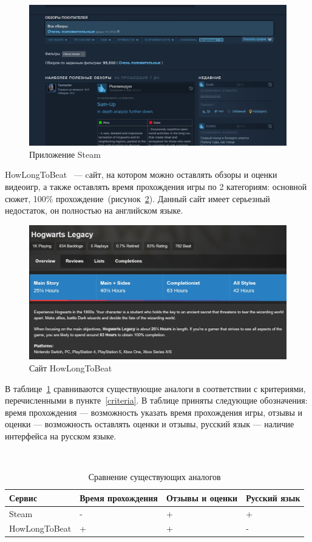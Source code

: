 \begin{figure}[H]
	\centering
	\includegraphics[width=0.7\linewidth]{../imgs/steam_ex}
	\captionsetup{justification=centering}
	\caption{Приложение Steam}
	\label{fig:steamex}
\end{figure}

HowLongToBeat~\cite{hltb} --- cайт, на котором можно оставлять обзоры и оценки видеоигр, а также оставлять время прохождения игры по 2 категориям: основной сюжет, 100\% прохождение~(рисунок~\ref{fig:hltbex}). Данный сайт имеет серьезный недостаток, он полностью на английском языке.
\clearpage
\begin{figure}[H]
	\centering
	\includegraphics[width=0.7\linewidth]{../imgs/hltb_ex}
	\captionsetup{justification=centering}
	\caption{Сайт HowLongToBeat}
	\label{fig:hltbex}
\end{figure}

В таблице~\ref{tbl:2} сравниваются существующие аналоги в соответствии с критериями, перечисленными в пункте~\ref{criteria}. В таблице приняты следующие обозначения: время прохождения --- возможность указать время прохождения игры, отзывы и оценки ---  возможность оставлять оценки и отзывы, русский язык --- наличие интерфейса на русском языке.

~

\captionsetup{justification=raggedleft,singlelinecheck=off}
\begin{table}[H]
	\centering
	\caption{Сравнение существующих аналогов}
	\label{tbl:2}
	\begin{tabular}{|l|l|l|l|}
		\hline
		Сервис & Время прохождения & Отзывы и оценки  & Русский язык \\ \hline
		Steam & - & + & +  \\ \hline
		HowLongToBeat & +  & + & - \\ \hline
	\end{tabular}
\end{table}

